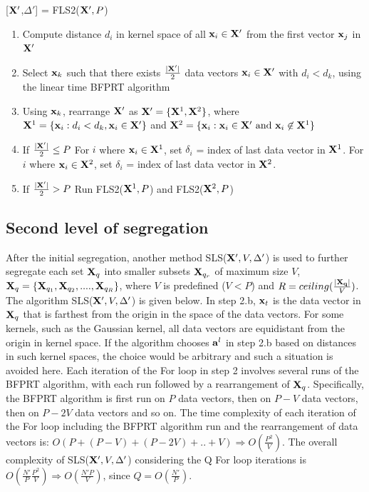 \documentclass[twoside]{article}
\begin{document}
\begin{algorithm}[h]
 \renewcommand{\thealgorithm}{}
\caption{[${\bf X}' $,$\Delta' $] = FLS2(${\bf X}' ,P$)}
\begin{enumerate} \addtolength{\itemsep}{-.35\baselineskip}
 \item Compute distance $d_i$ in kernel space of all ${\bf x}_i \in {\bf X}' $ from the first vector ${\bf x}_j$ in ${\bf X}' $
 \item Select ${\bf x}_k$ such that there exists $\frac{|{\bf X}' |}{2}$ data vectors ${\bf x}_i \in {\bf X}' $ with $d_i < d_k$, using the linear time BFPRT algorithm
 \item Using ${\bf x}_k$, rearrange ${\bf X}' $ as ${\bf X}'  = \{{\bf X}^1,{\bf X}^2\}$, where ${\bf X}^1 = \{{\bf x}_i: d_i < d_k, {\bf x}_i \in {\bf X}' \}$ and ${\bf X}^2 = \{{\bf x}_i: {\bf x}_i \in {\bf X}'  \text{ and } {\bf x}_i \not\in {\bf X}^1\}$
 \item If $\frac{|{\bf X}' |}{2} \le P$
 \subitem For $i$ where ${\bf x}_i \in {\bf X}^1$, set $\delta_i$ = index of last data vector in ${\bf X}^1$.
 \subitem For $i$ where ${\bf x}_i \in {\bf X}^2$, set $\delta_i$ = index of last data vector in ${\bf X}^2$.
 \item If $\frac{|{\bf X}' |}{2} > P$
 \subitem Run FLS2(${\bf X}^1,P$) and FLS2(${\bf X}^2,P$)
\end{enumerate}
\end{algorithm}

\subsection{Second level of segregation}
After the initial segregation, another method SLS(${\bf X}' ,V,\Delta' $) is used to further segregate each set ${\bf X}_q$ into smaller subsets ${\bf X}_{q_r}$ of maximum size $V$, ${\bf X}_q = \{{\bf X}_{q_1}, {\bf X}_{q_2},....,{\bf X}_{q_R}\}$, where $V$ is predefined ($V < P$) and $R = ceiling(\frac{|{\bf X_q}|}{V})$. The algorithm SLS(${\bf X}' ,V,\Delta' $) is given below. In step 2.b, ${\bf x}_t$ is the data vector in ${\bf X}_q$ that is farthest from the origin in the space of the data vectors. For some kernels, such as the Gaussian kernel, all data vectors are equidistant from the origin in kernel space. If the algorithm chooses ${\bf a}^l$ in step 2.b based on distances in such kernel spaces, the choice would be arbitrary and such a situation is avoided here. Each iteration of the For loop in step 2 involves several runs of the BFPRT algorithm, with each run followed by a rearrangement of ${\bf X}_q$. Specifically, the BFPRT algorithm is first run on $P$ data vectors, then on $P - V$ data vectors, then on $P - 2V$ data vectors and so on. The time complexity of each iteration of the For loop including the BFPRT algorithm run and the rearrangement of data vectors is: $O(P + (P - V) + (P- 2V) + ..+ V) \Rightarrow O(\frac{P^2}{V})$. The overall complexity of SLS(${\bf X}' ,V,\Delta' $) considering the Q For loop iterations is $O(\frac{N' }{P}\frac{P^2}{V})  \Rightarrow O(\frac{N' P}{V})$, since $Q = O(\frac{N' }{P})$. \newline
\end{document}
